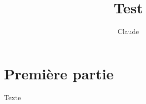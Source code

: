 \documentclass[11pt, french]{report}
\title{Test}
\author{Claude}
\begin{document}
	\maketitle

	\section*{Première partie}
	
	Texte
	
\end{document}
